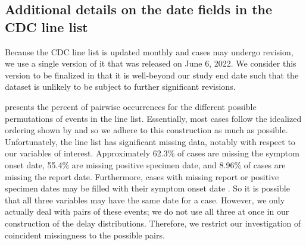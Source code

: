 \subsection{Additional details on the date fields in the CDC line list}
\label{supp:linelist-details}

Because the CDC line list is updated monthly and cases may undergo revision, we
use a single version of it that was released on June 6, 2022. We consider this
version to be finalized in that it is well-beyond our study end date such that
the dataset is unlikely to be subject to further significant revisions.

 presents the percent of pairwise occurrences for
the different possible permutations of events in the line list. Essentially,
most cases follow the idealized ordering shown by
 and so we adhere to this construction as
much as possible. Unfortunately, the line list has significant missing data,
notably with respect to our variables of interest. Approximately 62.3\% of cases
are missing the symptom onset date, 55.4\% are missing positive specimen date,
and 8.96\% of cases are missing the report date. Furthermore, cases with missing
report or positive specimen dates may be filled with their symptom onset date
\citep{jahja2022real}. So it is possible that all three variables may have the
same date for a case. However, we only actually deal with pairs of these events;
we do not use all three at once in our construction of the delay distributions.
Therefore, we restrict our investigation of coincident missingness to the possible pairs.

